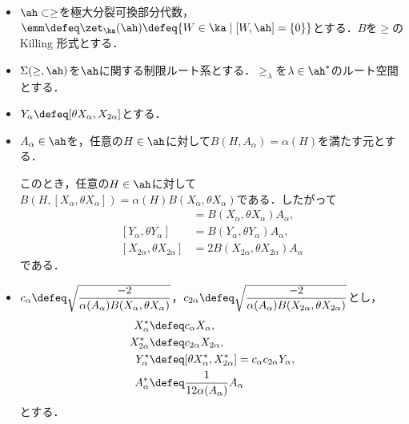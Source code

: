 \begin{nttdef}\label{nttdef:su21-red}
  \leavevmode
  \vspace{-1em}
  \begin{itemize}
  \item $\ah \subset \ge$を極大分裂可換部分代数，$\emm \defeq \zet_{\ka}(\ah) \defeq \{W\in \ka\mid [W,\ah] = \{0\} \} $とする．$B$を$\ge$のKilling 形式とする．
  \item $\Sigma(\ge,\ah) $を$\ah$に関する制限ルート系とする．$\ge_{\lambda} $を$\lambda\in \ah^{*}$のルート空間とする．
  \item $Y_{\alpha}\defeq [\theta X_{\alpha}, X_{2\alpha}] $とする．
  \item $A_{\alpha}\in \ah $を，任意の$H\in \ah$に対して$B(H,A_{\alpha}) = \alpha(H) $を満たす元とする．
    
    このとき，任意の$H\in \ah$に対して$B(H, [X_{\alpha}, \theta X_{\alpha}]) = \alpha(H) B(X_{\alpha}, \theta X_{\alpha}) $である．したがって
      \begin{align*}
        [X_{\alpha}, \theta X_{\alpha}] &= B(X_{\alpha}, \theta X_{\alpha})A_{\alpha} ,\\
        [Y_{\alpha}, \theta Y_{\alpha}] &= B(Y_{\alpha}, \theta Y_{\alpha})A_{\alpha}, \\
        [X_{2\alpha}, \theta X_{2\alpha}] &= 2B(X_{2\alpha}, \theta X_{2\alpha})A_{\alpha} 
      \end{align*}
    である．
    \item $c_{\alpha}\defeq \sqrt{\dfrac{-2}{\alpha(A_{\alpha})B(X_{\alpha}, \theta X_{\alpha})}} $，$ c_{2\alpha}  \defeq \sqrt{\dfrac{-2}{\alpha(A_{\alpha})B(X_{2\alpha}, \theta X_{2\alpha})}} $とし，
      \begin{align*}
        X_{\alpha}^{*} &\defeq c_{\alpha}X_{\alpha}, \\
        X_{2\alpha}^{*} &\defeq c_{2\alpha}X_{2\alpha},\\ 
        Y_{\alpha}^{*} &\defeq [\theta X_{\alpha}^{*}, X_{2\alpha}^{*} ] = c_{\alpha}c_{2\alpha}Y_{\alpha} ,\\
        A_{\alpha}^{*} &\defeq \dfrac{1}{12\alpha(A_{\alpha}) %
      }A_{\alpha} 
      \end{align*}
    とする．
  \end{itemize}
\end{nttdef}

